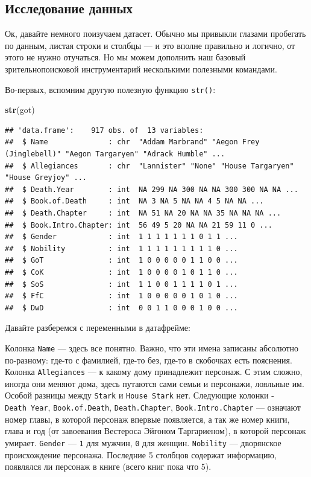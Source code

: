 \documentclass[]{book}
\newenvironment{Shaded}{\begin{snugshade}}{\end{snugshade}}
\newcommand{\KeywordTok}[1]{\textcolor[rgb]{0.13,0.29,0.53}{\textbf{#1}}}
\newcommand{\NormalTok}[1]{#1}
\begin{document}
\hypertarget{explore}{%
\subsection{Исследование данных}\label{explore}}

Ок, давайте немного поизучаем датасет. Обычно мы привыкли глазами пробегать по данным, листая строки и столбцы --- и это вполне правильно и логично, от этого не нужно отучаться. Но мы можем дополнить наш базовый зрительнопоисковой инструментарий несколькими полезными командами.

Во-первых, вспомним другую полезную функцию \texttt{str()}:

\begin{Shaded}
\begin{Highlighting}[]
\KeywordTok{str}\NormalTok{(got)}
\end{Highlighting}
\end{Shaded}

\begin{verbatim}
## 'data.frame':    917 obs. of  13 variables:
##  $ Name              : chr  "Addam Marbrand" "Aegon Frey (Jinglebell)" "Aegon Targaryen" "Adrack Humble" ...
##  $ Allegiances       : chr  "Lannister" "None" "House Targaryen" "House Greyjoy" ...
##  $ Death.Year        : int  NA 299 NA 300 NA NA 300 300 NA NA ...
##  $ Book.of.Death     : int  NA 3 NA 5 NA NA 4 5 NA NA ...
##  $ Death.Chapter     : int  NA 51 NA 20 NA NA 35 NA NA NA ...
##  $ Book.Intro.Chapter: int  56 49 5 20 NA NA 21 59 11 0 ...
##  $ Gender            : int  1 1 1 1 1 1 1 0 1 1 ...
##  $ Nobility          : int  1 1 1 1 1 1 1 1 1 0 ...
##  $ GoT               : int  1 0 0 0 0 0 1 1 0 0 ...
##  $ CoK               : int  1 0 0 0 0 1 0 1 1 0 ...
##  $ SoS               : int  1 1 0 0 1 1 1 1 0 1 ...
##  $ FfC               : int  1 0 0 0 0 0 1 0 1 0 ...
##  $ DwD               : int  0 0 1 1 0 0 0 1 0 0 ...
\end{verbatim}

Давайте разберемся с переменными в датафрейме:

Колонка \texttt{Name} --- здесь все понятно. Важно, что эти имена записаны абсолютно по-разному: где-то с фамилией, где-то без, где-то в скобочках есть пояснения. Колонка \texttt{Allegiances} --- к какому дому принадлежит персонаж. С этим сложно, иногда они меняют дома, здесь путаются сами семьи и персонажи, лояльные им. Особой разницы между \texttt{Stark} и \texttt{House\ Stark} нет. Следующие колонки - \texttt{Death\ Year}, \texttt{Book.of.Death}, \texttt{Death.Chapter}, \texttt{Book.Intro.Chapter} --- означают номер главы, в которой персонаж впервые появляется, а так же номер книги, глава и год (от завоевания Вестероса Эйгоном Таргариеном), в которой персонаж умирает. \texttt{Gender} --- \texttt{1} для мужчин, \texttt{0} для женщин. \texttt{Nobility} --- дворянское происхождение персонажа. Последние 5 столбцов содержат информацию, появлялся ли персонаж в книге (всего книг пока что 5).
\end{document}
